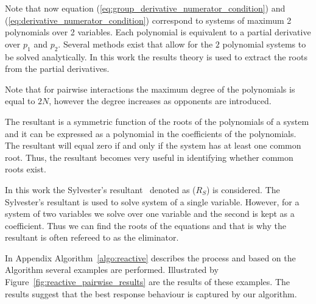 \documentclass[10pt]{article}
\begin{document}
Note that now equation (\ref{eq:group_derivative_numerator_condition}) and (\ref{eq:derivative_numerator_condition})
correspond to systems of maximum 2 polynomials over 2 variables. Each polynomial is equivalent
to a partial derivative over \(p_1\) and \(p_2\). Several methods exist that allow
for the \(2\) polynomial systems to be solved analytically. In this work the results theory
is used to extract the roots from the partial derivatives.

Note that for pairwise interactions the maximum degree
of the polynomials is equal to \(2N\), however the degree increases as opponents
are introduced.

The resultant is a symmetric function of the roots of the polynomials of a system
and it can be expressed as a polynomial in the coefficients of the polynomials.
The resultant will equal zero if and only if the system has at least one common
root. Thus, the resultant becomes very useful in identifying whether common roots exist.

In this work the Sylvester's resultant~\cite{Akritas1991} denoted as (\(R_S\))
is considered. The Sylvester's resultant is used to solve system of a single
variable. However, for a system of two variables we solve over one variable and
the second is kept as a coefficient. Thus we can find the roots of the equations
and that is why the resultant is often refereed to as the eliminator.

In Appendix Algorithm~\ref{algo:reactive} describes the process and based on the
Algorithm several examples are performed. Illustrated by Figure~\ref{fig:reactive_pairwise_results}
are the results of these examples. The results suggest that the best response behaviour
is captured by our algorithm.
\end{document}
